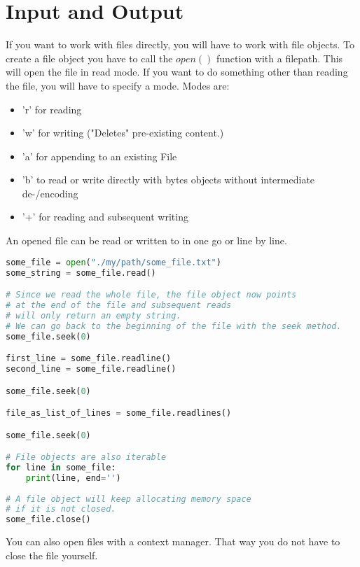 \documentclass{article}
\begin{document}


\section{Input and Output}

If you want to work with files directly, you will have to work with file objects.
To create a file object you have to call the $open()$ function with a filepath.
This will open the file in read mode.
If you want  to do something other than reading the file, you will have to specify a mode.
Modes are:

\begin{itemize}
    \item 'r' for reading
    \item 'w' for writing ("Deletes" pre-existing content.)
    \item 'a' for appending to an existing File
    \item 'b' to read or write directly with bytes objects without intermediate de-/encoding
    \item '+' for reading and subsequent writing
\end{itemize}

An opened file can be read or written to in one go or line by line.

\begin{lstlisting}[language=Python]
some_file = open("./my/path/some_file.txt")
some_string = some_file.read()

# Since we read the whole file, the file object now points
# at the end of the file and subsequent reads
# will only return an empty string.
# We can go back to the beginning of the file with the seek method.
some_file.seek(0)

first_line = some_file.readline()
second_line = some_file.readline()

some_file.seek(0)

file_as_list_of_lines = some_file.readlines()

some_file.seek(0)

# File objects are also iterable
for line in some_file:
    print(line, end='')
 
# A file object will keep allocating memory space
# if it is not closed. 
some_file.close()
\end{lstlisting}

You can also open files with a context manager.
That way you do not have to close the file yourself.
\end{document}
